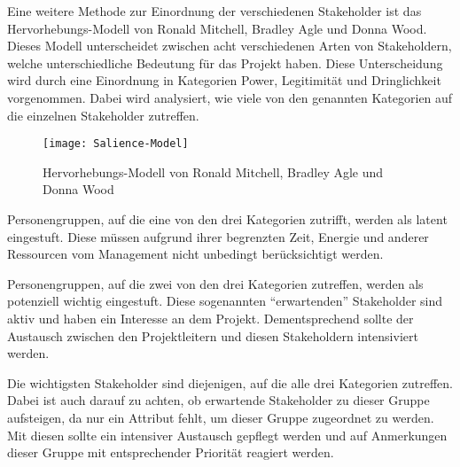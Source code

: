 Eine weitere Methode zur Einordnung der verschiedenen Stakeholder ist das Hervorhebungs-Modell von Ronald Mitchell, Bradley Agle und Donna Wood.
Dieses Modell unterscheidet zwischen acht verschiedenen Arten von Stakeholdern, welche unterschiedliche Bedeutung für das Projekt haben.
Diese Unterscheidung wird durch eine Einordnung in Kategorien Power, Legitimität und Dringlichkeit vorgenommen.
Dabei wird analysiert, wie viele von den genannten Kategorien auf die einzelnen Stakeholder zutreffen.

\begin{figure}[ht]
    \centering
    \texttt{[image: Salience-Model]}
    \caption{Hervorhebungs-Modell von Ronald Mitchell, Bradley Agle und Donna Wood\autocite[Seite 874]{Mitchell.1997}}
    \label{fig:highlight-model}
\end{figure}

Personengruppen, auf die eine von den drei Kategorien zutrifft, werden als latent eingestuft.
Diese müssen aufgrund ihrer begrenzten Zeit, Energie und anderer Ressourcen vom Management nicht unbedingt berücksichtigt werden.

Personengruppen, auf die zwei von den drei Kategorien zutreffen, werden als potenziell wichtig eingestuft.
Diese sogenannten ``erwartenden'' Stakeholder sind aktiv und haben ein Interesse an dem Projekt.
Dementsprechend sollte der Austausch zwischen den Projektleitern und diesen Stakeholdern intensiviert werden.

Die wichtigsten Stakeholder sind diejenigen, auf die alle drei Kategorien zutreffen.
Dabei ist auch darauf zu achten, ob erwartende Stakeholder zu dieser Gruppe aufsteigen, da nur ein Attribut fehlt, um dieser Gruppe zugeordnet zu werden.
Mit diesen sollte ein intensiver Austausch gepflegt werden und auf Anmerkungen dieser Gruppe mit entsprechender Priorität reagiert werden\autocite[vgl.][Seite 874ff]{Mitchell.1997}.


